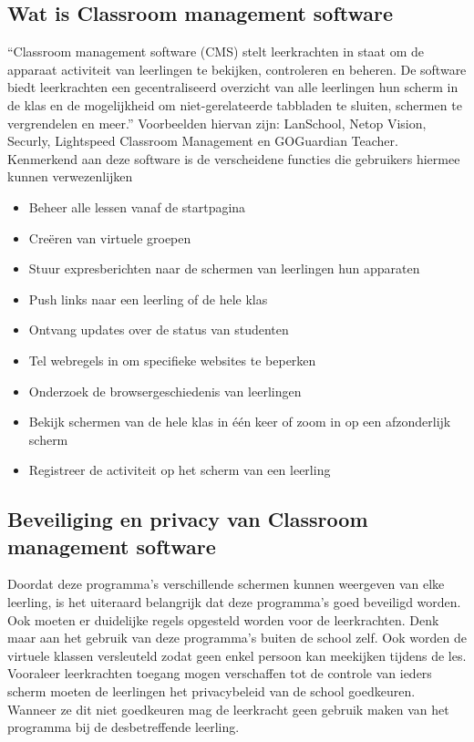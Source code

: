 \subsection{Wat is Classroom management software}
``Classroom management software (CMS) stelt leerkrachten in staat om de apparaat activiteit van leerlingen te bekijken, controleren en beheren. De software biedt leerkrachten een gecentraliseerd overzicht van alle leerlingen hun scherm in de klas en de mogelijkheid om niet-gerelateerde tabbladen te sluiten, schermen te vergrendelen en meer.'' \autocite{ClassroomManagement} 
Voorbeelden hiervan zijn: LanSchool, Netop Vision, Securly, Lightspeed Classroom Management en GOGuardian Teacher. 
Kenmerkend aan deze software is de verscheidene functies die gebruikers hiermee kunnen verwezenlijken
\begin{itemize}
    \item Beheer alle lessen vanaf de startpagina
    \item Creëren van virtuele groepen 
    \item Stuur expresberichten naar de schermen van leerlingen hun apparaten 
    \item Push links naar een leerling of de hele klas
    \item Ontvang updates over de status van studenten 
    \item Tel webregels in om specifieke websites te beperken
    \item Onderzoek de browsergeschiedenis van leerlingen 
    \item Bekijk schermen van de hele klas in één keer of zoom in op een afzonderlijk scherm
    \item Registreer de activiteit op het scherm van een leerling
    \newline
    \autocite{Lightspeed}
\end{itemize}

\subsection{Beveiliging en privacy van Classroom management software}
Doordat deze programma's verschillende schermen kunnen weergeven van elke leerling, is het uiteraard belangrijk dat deze programma's goed beveiligd worden. Ook moeten er duidelijke regels opgesteld worden voor de leerkrachten. Denk maar aan het gebruik van deze programma's buiten de school zelf. Ook worden de virtuele klassen versleuteld zodat geen enkel persoon kan meekijken tijdens de les. Vooraleer leerkrachten toegang mogen verschaffen tot de controle van ieders scherm moeten de leerlingen het privacybeleid van de school goedkeuren. Wanneer ze dit niet goedkeuren mag de leerkracht geen gebruik maken van het programma bij de desbetreffende leerling. \autocite{privacy}


